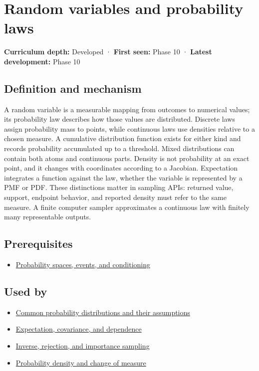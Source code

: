 \hypertarget{appendix-4d0203f7944f}{}\label{referencestart:appendix-4d0203f7944f}
\section{Random variables and probability laws}\label{appendix-4d0203f7944f-random-variables-and-probability-laws}

\textbf{Curriculum depth:} Developed · \textbf{First seen:} Phase 10 · \textbf{Latest development:} Phase 10

\subsection{Definition and mechanism}\label{appendix-4d0203f7944f-definition-and-mechanism}

A random variable is a measurable mapping from outcomes to numerical values; its probability law describes how those values are distributed. Discrete laws assign probability mass to points, while continuous laws use densities relative to a chosen measure. A cumulative distribution function exists for either kind and records probability accumulated up to a threshold. Mixed distributions can contain both atoms and continuous parts. Density is not probability at an exact point, and it changes with coordinates according to a Jacobian. Expectation integrates a function against the law, whether the variable is represented by a PMF or PDF. These distinctions matter in sampling APIs: returned value, support, endpoint behavior, and reported density must refer to the same measure. A finite computer sampler approximates a continuous law with finitely many representable outputs.

\subsection{Prerequisites}\label{appendix-4d0203f7944f-prerequisites}

\begin{itemize}
\tightlist
\item
  \hyperref[appendix-f1ef323f6ed7]{Probability spaces, events, and conditioning}
\end{itemize}

\subsection{Used by}\label{appendix-4d0203f7944f-used-by}

\begin{itemize}
\tightlist
\item
  \hyperref[appendix-a2360b435383]{Common probability distributions and their assumptions}
\item
  \hyperref[appendix-54c383df9992]{Expectation, covariance, and dependence}
\item
  \hyperref[appendix-8d863ed954d0]{Inverse, rejection, and importance sampling}
\item
  \hyperref[appendix-4815cd87ab8b]{Probability density and change of measure}
\end{itemize}

